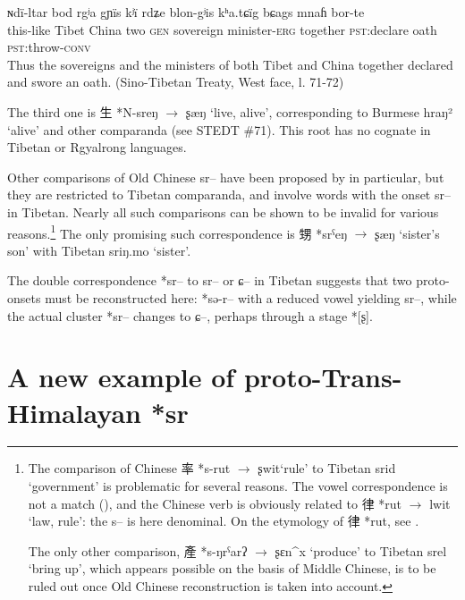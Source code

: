 \documentclass[oldfontcommands,oneside,a4paper,11pt]{article}
\newcommand{\ipa}[1]{{\phon #1}} %
\newcommand{\zh}[1]{{\cn #1}}
\begin{document}
\begin{exe}
\ex \label{ex:bshags}
\gll
\ipa{ɴdï-ltar} 	\ipa{bod} 	\ipa{rgʲa} 	\ipa{gɲïs} 	\ipa{kʲï} 	\ipa{rdʑe} \ipa{blon-gʲis} 	\ipa{kʰa.tɕïg} 	\ipa{bɕags} 	\ipa{mnaɦ} 	\ipa{bor-te} \\
this-like Tibet China two \textsc{gen} sovereign minister-\textsc{erg} together \textsc{pst}:declare oath \textsc{pst}:throw-\textsc{conv} \\
\glt Thus the sovereigns and the ministers of both Tibet and China together declared and swore an oath. (Sino-Tibetan Treaty, West face, l. 71-72)
\end{exe}

The third one is \zh{生} *\ipa{N-sreŋ} $\rightarrow$ \ipa{ʂæŋ} `live, alive', corresponding to Burmese \ipa{hraŋ²} `alive' and other comparanda (see STEDT \#71). This root has no cognate in Tibetan or Rgyalrong languages.

Other comparisons of Old Chinese \ipa{*sr--} have been proposed by \citet{coblin86handlist} in particular, but they are restricted to Tibetan comparanda, and involve words with the onset \ipa{sr--} in Tibetan. Nearly all such comparisons can be shown to be invalid for various reasons.\footnote{The comparison of Chinese \zh{率} *\ipa{s-rut} $\rightarrow$ \ipa{ʂwit}`rule' to Tibetan \ipa{srid} `government' is problematic for several reasons. The vowel correspondence is not a match (\citealt{gong95st}), and the Chinese verb is obviously related to \zh{律} *\ipa{rut} $\rightarrow$ \ipa{lwit} `law, rule': the \ipa{s--} is here denominal. On the etymology of \zh{律} *\ipa{rut}, see \citet{sagart14lv}.

The only other comparison, \zh{產} *\ipa{s-ŋrˁarʔ} $\rightarrow$ \ipa{ʂɛn^x} `produce' to Tibetan \ipa{srel} `bring up', which appears possible on the basis of Middle Chinese, is to be ruled out once Old Chinese reconstruction is taken into account.
}
The only promising such correspondence is \zh{甥} *\ipa{srˁeŋ} $\rightarrow$ \ipa{ʂæŋ} `sister's son' with Tibetan \ipa{sriŋ.mo} `sister'. 



The double correspondence *\ipa{sr--} to \ipa{sr--} or \ipa{ɕ--} in Tibetan suggests that two proto-onsets must be reconstructed here: *\ipa{sə-r--} with a reduced vowel yielding \ipa{sr--}, while the actual cluster *\ipa{sr--} changes to \ipa{ɕ--}, perhaps through a stage *[\ipa{ʂ}].



\section{A new example of proto-Trans-Himalayan *\ipa{sr}}
\end{document}
